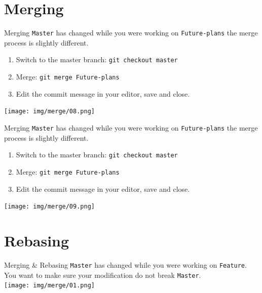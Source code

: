 \documentclass[usenames,dvipsnames,9pt]{beamer}
\begin{document}
\section{Merging}

%
%

\begin{frame}{Merging}
\texttt{Master} has changed while you were working on \texttt{Future-plans} the merge process is slightly different.
\begin{enumerate}
  \item Switch to the master branch: \lstinline|git checkout master|
  \item Merge: \lstinline|git merge Future-plans|
  \item Edit the commit message in your editor, save and close.
\end{enumerate}
\texttt{[image: img/merge/08.png]}
\end{frame}

\begin{frame}{Merging}
  \texttt{Master} has changed while you were working on \texttt{Future-plans} the merge process is slightly different.
  \begin{enumerate}
    \item Switch to the master branch: \lstinline|git checkout master|
    \item Merge: \lstinline|git merge Future-plans|
    \item Edit the commit message in your editor, save and close.
  \end{enumerate}
\texttt{[image: img/merge/09.png]}
\end{frame}

%
%

\section{Rebasing}

\begin{frame}{Merging \& Rebasing}
\texttt{Master} has changed while you were working on \texttt{Feature}.\\
You want to make sure your modification do not break \texttt{Master}.\\
\vspace{0.37cm}
\texttt{[image: img/merge/01.png]}
\end{frame}
\end{document}
